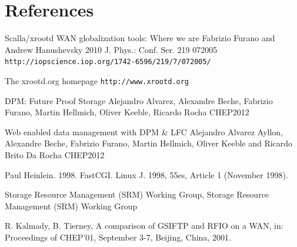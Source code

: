 \documentclass[a4paper]{jpconf}
\begin{document}
\section*{References}
\begin{thebibliography}{9}

 Scalla/xrootd WAN globalization tools: Where we are
Fabrizio Furano and Andrew Hanushevsky 2010 J. Phys.: Conf. Ser. 219 072005
\verb"http://iopscience.iop.org/1742-6596/219/7/072005/"

 The xrootd.org homepage
\verb"http://www.xrootd.org"

 DPM: Future Proof Storage
Alejandro Alvarez, Alexandre Beche, Fabrizio Furano, Martin Hellmich, Oliver Keeble, Ricardo Rocha
CHEP2012

 Web enabled data management with DPM \& LFC
Alejandro Alvarez Ayllon, Alexandre Beche, Fabrizio Furano, Martin Hellmich, Oliver Keeble and Ricardo Brito Da Rocha
CHEP2012

 Paul Heinlein. 1998. FastCGI. Linux J. 1998, 55es, Article 1 (November 1998).

 Storage Resource Management (SRM) Working Group, Storage Resource Management (SRM) Working Group

 R. Kalmady, B. Tierney, A comparison of GSIFTP and RFIO on a WAN, in: Proceedings of CHEP'01, September 3-7, Beijing, China, 2001.
\end{thebibliography}
\end{document}
